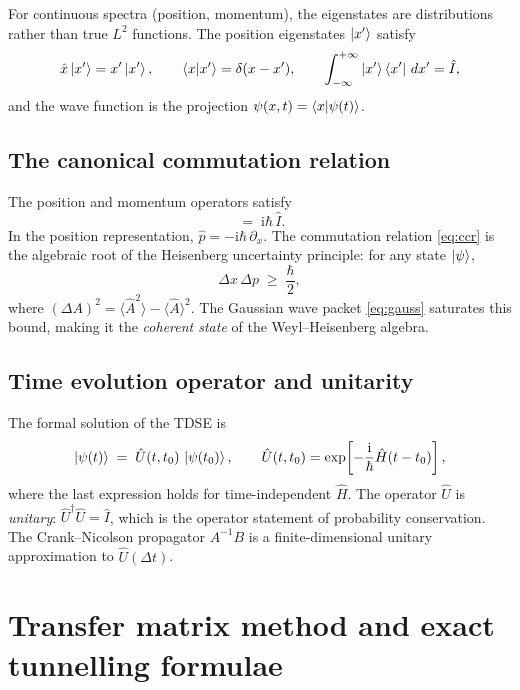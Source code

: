 \documentclass[12pt, a4paper]{article}
\newcommand{\dt}{\Delta t}
\newcommand{\ii}{\mathrm{i}}          %
\newcommand{\CN}{Crank--Nicolson}
\begin{document}
For continuous spectra (position, momentum), the eigenstates are
distributions rather than true $L^2$ functions.  The position
eigenstates $\ket{x'}$ satisfy
\begin{equation}
  \hat{x}\ket{x'} = x'\ket{x'}, \qquad
  \braket{x}{x'} = \delta(x-x'), \qquad
  \int_{-\infty}^{+\infty} \ket{x'}\bra{x'}\,dx' = \hat{I},
\end{equation}
and the wave function is the projection
$\psi(x,t) = \braket{x}{\psi(t)}$.

\subsection{The canonical commutation relation}

The position and momentum operators satisfy
\begin{equation}
  [\hat{x},\, \hat{p}] \;=\; \ii\hbar\,\hat{I}.
  \label{eq:ccr}
\end{equation}
In the position representation, $\hat{p} = -\ii\hbar\,\partial_x$.
The commutation relation \eqref{eq:ccr} is the algebraic root of the
Heisenberg uncertainty principle: for any state $\ket{\psi}$,
\begin{equation}
  \Delta x\,\Delta p \;\geq\; \frac{\hbar}{2},
\end{equation}
where $(\Delta A)^2 = \langle \hat{A}^2\rangle - \langle\hat{A}\rangle^2$.
The Gaussian wave packet \eqref{eq:gauss} saturates this bound, making
it the \emph{coherent state} of the Weyl--Heisenberg algebra.

\subsection{Time evolution operator and unitarity}

The formal solution of the TDSE is
\begin{equation}
  \ket{\psi(t)} \;=\; \hat{U}(t,t_0)\,\ket{\psi(t_0)},
  \qquad
  \hat{U}(t,t_0) = \exp\!\left[-\frac{\ii}{\hbar}\hat{H}(t-t_0)\right],
\end{equation}
where the last expression holds for time-independent $\hat{H}$.
The operator $\hat{U}$ is \emph{unitary}: $\hat{U}^\dagger \hat{U} = \hat{I}$,
which is the operator statement of probability conservation.
The \CN{} propagator $A^{-1}B$ is a finite-dimensional unitary
approximation to $\hat{U}(\dt)$.

\section{Transfer matrix method and exact tunnelling formulae}
\label{app:transfer}
\end{document}
